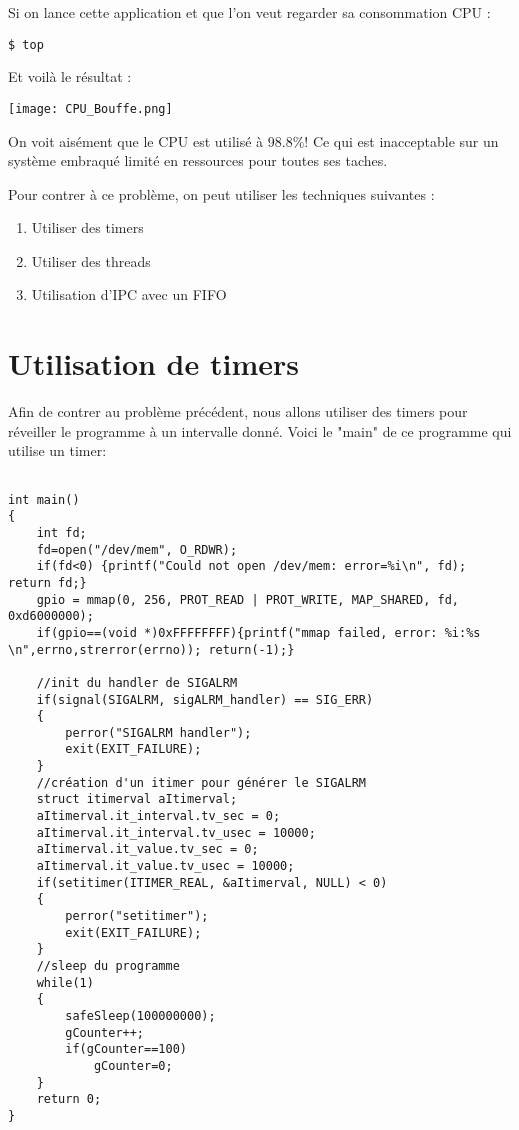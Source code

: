 Si on lance cette application et que l'on veut regarder sa consommation CPU :

\begin{lstlisting}[frame=single,style=Console]
$ top
\end{lstlisting}
\pagebreak Et voilà le résultat :


\begin{center} 
\hspace{12.45cm}
\texttt{[image: CPU\_Bouffe.png]}
\end{center}
\vspace{1cm}

On voit aisément que le CPU est utilisé à 98.8\%! Ce qui est  inacceptable sur un système embraqué limité en ressources pour toutes ses taches.

Pour contrer à ce problème, on peut utiliser les techniques suivantes :
\begin{enumerate}
\item Utiliser des timers
\item Utiliser des threads
\item Utilisation d'IPC avec un FIFO
\end{enumerate}


\section{Utilisation de timers}

Afin de contrer au problème précédent, nous allons utiliser des timers pour réveiller le programme à un intervalle donné. Voici le "main" de ce programme qui utilise un timer:

\begin{lstlisting}[frame=single,style=C]  % Start your code-block

int main()
{
	int fd;
	fd=open("/dev/mem", O_RDWR);
	if(fd<0) {printf("Could not open /dev/mem: error=%i\n", fd); return fd;}
	gpio = mmap(0, 256, PROT_READ | PROT_WRITE, MAP_SHARED, fd, 0xd6000000);
	if(gpio==(void *)0xFFFFFFFF){printf("mmap failed, error: %i:%s \n",errno,strerror(errno)); return(-1);}

	//init du handler de SIGALRM
	if(signal(SIGALRM, sigALRM_handler) == SIG_ERR)
	{
		perror("SIGALRM handler");
		exit(EXIT_FAILURE);
	}
	//création d'un itimer pour générer le SIGALRM
	struct itimerval aItimerval;
	aItimerval.it_interval.tv_sec = 0;
	aItimerval.it_interval.tv_usec = 10000;
	aItimerval.it_value.tv_sec = 0;
	aItimerval.it_value.tv_usec = 10000;
	if(setitimer(ITIMER_REAL, &aItimerval, NULL) < 0)
	{
		perror("setitimer");
		exit(EXIT_FAILURE);
	}
	//sleep du programme
	while(1)
	{
		safeSleep(100000000);
		gCounter++;
		if(gCounter==100)
			gCounter=0;
	}
	return 0;
}
\end{lstlisting}


